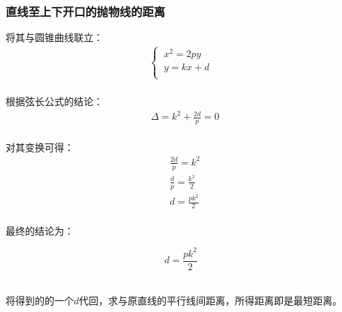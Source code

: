 \documentclass[UTF8]{ctexart}
\begin{document}
\subsubsection{直线至上下开口的抛物线的距离}
    将其与圆锥曲线联立：
    \setcounter{equation}{0}
    \begin{align}
        \begin{cases}
            ~x^2=2py\\[1mm]
            ~y=kx+d\\[1mm]
        \end{cases}
    \end{align}\\
    根据弦长公式的结论：
    \begin{align}
        &\Delta=k^2+\frac{2d}{p}=0
    \end{align}\\
    对其变换可得：
    \begin{align}
        &\frac{2d}{p}=k^2\\[3mm]
        &\frac{d}{p}=\frac{k^2}{2}\\[3mm]
        &d=\frac{pk^2}{2}
    \end{align}\\
    最终的结论为：
    \begin{large}
        \begin{equation*}
            d=\frac{pk^2}{2}
        \end{equation*}
    \end{large}\\
    将得到的的一个$d$代回，求与原直线的平行线间距离，所得距离即是最短距离。

\newpage
\end{document}
